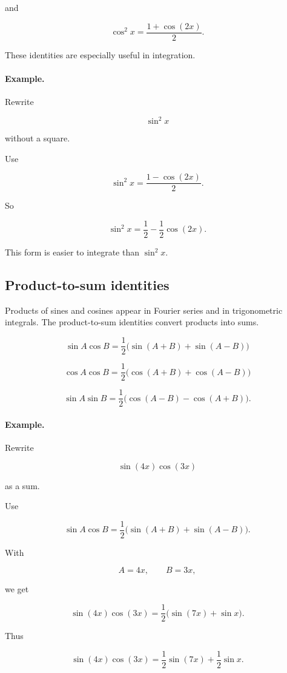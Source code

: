 and

\[
\boxed{
\cos^2 x=\frac{1+\cos(2x)}{2}.
}
\]

These identities are especially useful in integration.

\paragraph{Example.}
Rewrite

\[
\sin^2 x
\]

without a square.

Use

\[
\sin^2 x=\frac{1-\cos(2x)}{2}.
\]

So

\[
\boxed{
\sin^2 x=\frac12-\frac12\cos(2x).
}
\]

This form is easier to integrate than \(\sin^2 x\).

\subsection{Product-to-sum identities}
\label{appsubsec:product-to-sum}

Products of sines and cosines appear in Fourier series and in trigonometric integrals.
The product-to-sum identities convert products into sums.

\[
\boxed{
\sin A\cos B
=
\frac12\bigl(\sin(A+B)+\sin(A-B)\bigr)
}
\]

\[
\boxed{
\cos A\cos B
=
\frac12\bigl(\cos(A+B)+\cos(A-B)\bigr)
}
\]

\[
\boxed{
\sin A\sin B
=
\frac12\bigl(\cos(A-B)-\cos(A+B)\bigr).
}
\]

\paragraph{Example.}
Rewrite

\[
\sin(4x)\cos(3x)
\]

as a sum.

Use

\[
\sin A\cos B
=
\frac12\bigl(\sin(A+B)+\sin(A-B)\bigr).
\]

With

\[
A=4x,
\qquad
B=3x,
\]

we get

\[
\sin(4x)\cos(3x)
=
\frac12\bigl(\sin(7x)+\sin x\bigr).
\]

Thus

\[
\boxed{
\sin(4x)\cos(3x)
=
\frac12\sin(7x)+\frac12\sin x.
}
\]

